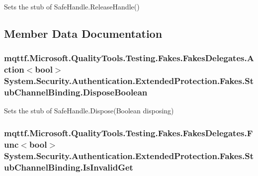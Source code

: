Sets the stub of Safe\-Handle.\-Release\-Handle()



\subsection{Member Data Documentation}
\hypertarget{class_system_1_1_security_1_1_authentication_1_1_extended_protection_1_1_fakes_1_1_stub_channel_binding_aa0e656be070cc70476d7fe39b9df0a22}{
\subsubsection[{Dispose\-Boolean}]{\setlength{\rightskip}{0pt plus 5cm}mqttf.\-Microsoft.\-Quality\-Tools.\-Testing.\-Fakes.\-Fakes\-Delegates.\-Action$<$bool$>$ System.\-Security.\-Authentication.\-Extended\-Protection.\-Fakes.\-Stub\-Channel\-Binding.\-Dispose\-Boolean}}\label{class_system_1_1_security_1_1_authentication_1_1_extended_protection_1_1_fakes_1_1_stub_channel_binding_aa0e656be070cc70476d7fe39b9df0a22}


Sets the stub of Safe\-Handle.\-Dispose(\-Boolean disposing)

\hypertarget{class_system_1_1_security_1_1_authentication_1_1_extended_protection_1_1_fakes_1_1_stub_channel_binding_a95620c407b8a212461bb441aedfd64ac}{
\subsubsection[{Is\-Invalid\-Get}]{\setlength{\rightskip}{0pt plus 5cm}mqttf.\-Microsoft.\-Quality\-Tools.\-Testing.\-Fakes.\-Fakes\-Delegates.\-Func$<$bool$>$ System.\-Security.\-Authentication.\-Extended\-Protection.\-Fakes.\-Stub\-Channel\-Binding.\-Is\-Invalid\-Get}}\label{class_system_1_1_security_1_1_authentication_1_1_extended_protection_1_1_fakes_1_1_stub_channel_binding_a95620c407b8a212461bb441aedfd64ac}


